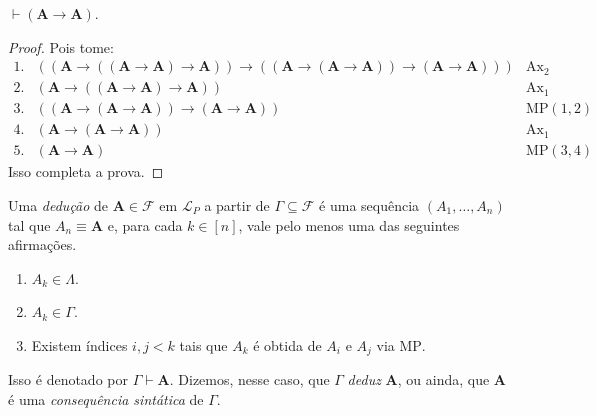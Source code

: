 \begin{example}
    $\vdash (\mathbf{A} \rightarrow \mathbf{A})$.
\end{example}

\begin{proof}
    Pois tome:
                \[
                    \begin{array}{rll}
                        1. & ((\mathbf{A} \rightarrow ((\mathbf{A} \rightarrow \mathbf{A}) \rightarrow \mathbf{A})) \rightarrow ((\mathbf{A} \rightarrow (\mathbf{A} \rightarrow \mathbf{A})) \rightarrow (\mathbf{A} \rightarrow \mathbf{A}) )) & \mathrm{Ax}_2 \\
                        2. & (\mathbf{A} \rightarrow ((\mathbf{A} \rightarrow \mathbf{A}) \rightarrow \mathbf{A})) & \mathrm{Ax}_1 \\
                        3. & ((\mathbf{A} \rightarrow (\mathbf{A} \rightarrow \mathbf{A})) \rightarrow (\mathbf{A} \rightarrow \mathbf{A}) ) & \text{MP}(1,2) \\
                        4. & (\mathbf{A} \rightarrow (\mathbf{A} \rightarrow \mathbf{A})) & \mathrm{Ax}_1 \\
                        5. & (\mathbf{A} \rightarrow \mathbf{A}) & \text{MP}(3,4)
                    \end{array}
                \]
            Isso completa a prova. \blackproof
\end{proof}

\begin{definition} \label{defi.fund:deducao.consequenciasintatica}
    Uma \emph{dedução} de $\mathbf{A} \in \mathcal{F}$ em $\mathcal{L}_P$ a partir de $\Gamma \subseteq \mathcal{F}$ é uma sequência $(A_1, \ldots, A_n)$ tal que $A_n \equiv \mathbf{A}$ e, para cada $k \in [n]$, vale pelo menos uma das seguintes afirmações.
        \begin{enumerate}[label=\roman*.]
            \item $A_k \in \Lambda$.
            \item $A_k \in \Gamma$.
            \item Existem índices $i,j < k$ tais que $A_k$ é obtida de $A_i$ e $A_j$ via $\mathrm{MP}$.
        \end{enumerate}
    Isso é denotado por $\Gamma \vdash \mathbf{A}$. Dizemos, nesse caso, que $\Gamma$ \emph{deduz} $\mathbf{A}$, ou ainda, que $\mathbf{A}$ é uma \emph{consequência sintática} de $\Gamma$.
\end{definition}

